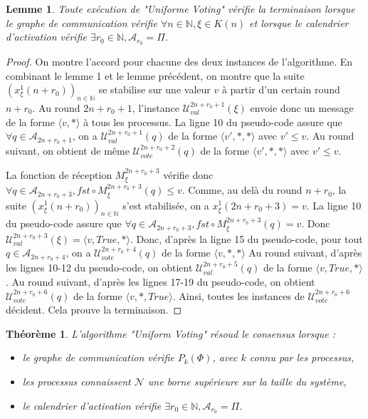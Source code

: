 \documentclass{article}
\newtheorem{lemma}{Lemme}
\newtheorem{theorem}{Théorème}
\begin{document}
	\begin{lemma}
		Toute exécution de "Uniforme Voting" vérifie la terminaison lorsque le graphe de communication vérifie $\forall n \in \mathds{N}, \xi \in K(n)$
		et lorsque le calendrier d'activation vérifie $\exists r_0 \in \mathds{N}, \mathcal{A}_{r_0} = \Pi$.
	\end{lemma}
	\begin{proof}
		On montre l'accord pour chacune des deux instances de l'algorithme.
		En combinant le lemme 1 et le lemme précédent, on montre que la suite $(x^1_\xi(n+r_0))_{n \in \mathds{N}}$ se stabilise sur une valeur $v$ à partir d'un certain round $n+r_0$.
		Au round $2n+r_0+1$, l'instance $\mathcal{U}^{2n+r_0+1}_{val}(\xi)$ envoie donc un message de la forme $\langle v, * \rangle$ à tous les processus.
		La ligne 10 du pseudo-code assure que $\forall q \in \mathcal{A}_{2n+r_0+1}$,
		on a $\mathcal{U}^{2n+r_0+1}_{val}(q)$ de la forme $\langle v', *, * \rangle$ avec $v' \leq v$.
		Au round suivant, on obtient de même $\mathcal{U}^{2n+r_0+2}_{vote}(q)$ de la forme $\langle v', *, * \rangle$ avec $v' \leq v$.

		La fonction de réception $M_\xi^{2n+r_0+3}$ vérifie donc
		$\forall q \in \mathcal{A}_{2n+r_0+3}, fst \circ M_\xi^{2n+r_0+3}(q) \leq v$.
		Comme, au delà du round $n+r_0$, la suite $(x^1_\xi(n+r_0))_{n \in \mathds{N}}$ s'est stabilisée, on a $x^1_\xi(2n+r_0+3) = v$.
		La ligne 10 du pseudo-code assure que $\forall q \in \mathcal{A}_{2n+r_0+3}, fst \circ M_\xi^{2n+r_0+3}(q) = v$.
		Donc $\mathcal{U}_{val}^{2n+r_0+3}(\xi) = \langle v, True, * \rangle$.
		Donc, d'après la ligne 15 du pseudo-code, pour tout $q \in \mathcal{A}_{2n+r_0+4}$, on a $\mathcal{U}_{vote}^{2n+r_0+4}(q)$ de la forme $\langle v, *, * \rangle$
		Au round suivant, d'après les lignes 10-12 du pseudo-code, on obtient $\mathcal{U}^{2n+r_0+5}_{val}(q)$ de la forme $\langle v, True, * \rangle$.
		Au round suivant, d'après les lignes 17-19 du pseudo-code, on obtient $\mathcal{U}^{2n+r_0+6}_{vote}(q)$ de la forme $\langle v, *, True \rangle$.
		Ainsi, toutes les instances de $\mathcal{U}_{vote}^{2n+r_0+6}$ décident.
		Cela prouve la terminaison.

	\end{proof}



\begin{theorem}

	L'algorithme "Uniform Voting" résoud le consensus lorsque :
	\begin{itemize}

		\item le graphe de communication vérifie $P_k(\Phi)$, avec $k$ connu par les processus,
		\item les processus connaissent $\mathcal{N}$ une borne supérieure sur la taille du système,
		\item le calendrier d'activation vérifie $\exists r_0 \in \mathds{N}, \mathcal{A}_{r_0} = \Pi$.

	\end{itemize}
\end{theorem}
\end{document}
